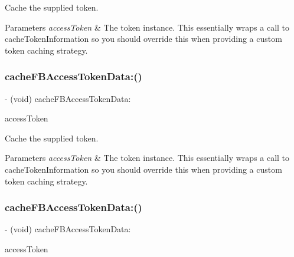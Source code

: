 Cache the supplied token. 
\begin{DoxyParams}{Parameters}
{\em access\+Token} & The token instance.  This essentially wraps a call to {\ttfamily cache\+Token\+Information} so you should override this when providing a custom token caching strategy. \\
\hline
\end{DoxyParams}
\mbox{\label{interfaceFBSessionTokenCachingStrategy_a35d668a867fcc88c491bb8d0c815c9f9}} 
\subsubsection{\texorpdfstring{cache\+F\+B\+Access\+Token\+Data\+:()}{cacheFBAccessTokenData:()}\hspace{0.1cm}{\footnotesize\ttfamily [4/5]}}
{\footnotesize\ttfamily -\/ (void) cache\+F\+B\+Access\+Token\+Data\+: \begin{DoxyParamCaption}\item[{(\hyperlink{interfaceFBAccessTokenData}{F\+B\+Access\+Token\+Data} $\ast$)}]{access\+Token }\end{DoxyParamCaption}}

Cache the supplied token. 
\begin{DoxyParams}{Parameters}
{\em access\+Token} & The token instance.  This essentially wraps a call to {\ttfamily cache\+Token\+Information} so you should override this when providing a custom token caching strategy. \\
\hline
\end{DoxyParams}
\mbox{\label{interfaceFBSessionTokenCachingStrategy_a35d668a867fcc88c491bb8d0c815c9f9}} 
\subsubsection{\texorpdfstring{cache\+F\+B\+Access\+Token\+Data\+:()}{cacheFBAccessTokenData:()}\hspace{0.1cm}{\footnotesize\ttfamily [5/5]}}
{\footnotesize\ttfamily -\/ (void) cache\+F\+B\+Access\+Token\+Data\+: \begin{DoxyParamCaption}\item[{(\hyperlink{interfaceFBAccessTokenData}{F\+B\+Access\+Token\+Data} $\ast$)}]{access\+Token }\end{DoxyParamCaption}}

